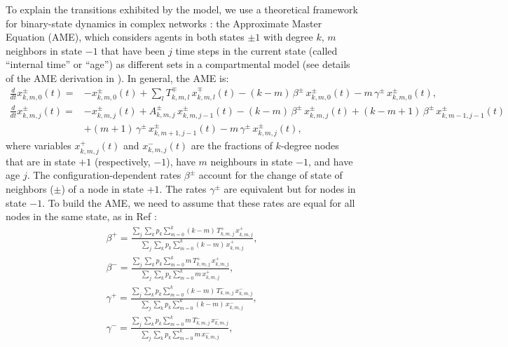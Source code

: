 To explain the transitions exhibited by the model, we use a theoretical framework for binary-state dynamics in complex networks \cite{gleeson-2013}: the Approximate Master Equation (AME), which considers agents in both states $\pm 1$ with degree $k$, $m$ neighbors in state $-1$ that have been $j$ time steps in the current state (called ``internal time'' or ``age'') as different sets in a compartmental model (see details of the AME derivation in \cite{Abella-2022-AME,gleeson-2013}). In general, the AME is:
\begin{eqnarray}
	\label{eq:AME_age}
	\frac{d}{d t} x^{\pm}_{k, m, 0}(t)=&- x^{\pm}_{k, m, 0}(t) + \sum_l T^{\mp}_{k, m,l} \, x^{\mp}_{k, m, l}(t) - (k-m) \,\beta^{\pm} \, x^{\pm}_{k, m, 0}(t) - m \,\gamma^{\pm} \, x^{\pm}_{k, m, 0}(t), 
	\nonumber\\
	\frac{d}{d t} x^{\pm}_{k, m, j}(t)=&- x^{\pm}_{k, m, j}(t)+ A^{\pm}_{k, m,j} \, x^{\pm}_{k, m, j-1}(t) - (k-m) \,\beta^{\pm} \, x^{\pm}_{k, m, j}(t) + (k-m+1) \,\beta^{\pm} \, x^{\pm}_{k, m-1, j-1}(t)\nonumber\\
	&+ (m+1) \,\gamma^{\pm} \, x^{\pm}_{k,m+1,j-1}(t) - m \,\gamma^{\pm} \, x^{\pm}_{k, m, j}(t), \nonumber
\end{eqnarray}
where variables $x^{+}_{k,m,j}(t)$ and $x^{-}_{k,m,j}(t)$ are the fractions of $k$-degree nodes that are in state $+1$ (respectively, $-1$), have $m$ neighbours in state $-1$, and have age $j$. The configuration-dependent rates $\beta^{\pm}$ account for the change of state of neighbors ($\pm$) of a node in state $+1$. The rates $\gamma^{\pm}$ are equivalent but for nodes in state $-1$. To build the AME, we need to assume that these rates are equal for all nodes in the same state, as in Ref \cite{gleeson-2013}:
\begin{eqnarray}
	\beta^{+} = \frac{\sum_j \sum_k p_k \sum_{m = 0}^{k} (k - m) \, T^{+}_{k,m,j} \, x^{+}_{k,m,j}}{\sum_j \sum_k p_k \sum_{m = 0}^{k} (k - m) \, x^{+}_{k,m,j}}, \nonumber\\
	\beta^{-} = \frac{\sum_j \sum_k p_k \sum_{m = 0}^{k} m \, T^{+}_{k,m,j} \, x^{+}_{k,m,j}}{\sum_j \sum_k p_k \sum_{m = 0}^{k} m \, x^{+}_{k,m,j}},\nonumber\\
	\gamma^{+} = \frac{\sum_j \sum_k p_k \sum_{m = 0}^{k} (k - m) \, T^{-}_{k,m,j} \, x^{-}_{k,m,j}}{\sum_j \sum_k p_k \sum_{m = 0}^{k} (k - m) \, x^{-}_{k,m,j}},\\
	\gamma^{-} = \frac{\sum_j \sum_k p_k \sum_{m = 0}^{k} m \, T^{-}_{k,m,j} \, x^{-}_{k,m,j}}{\sum_j \sum_k p_k \sum_{m = 0}^{k} m \, x^{-}_{k,m,j}},\nonumber
\end{eqnarray}

